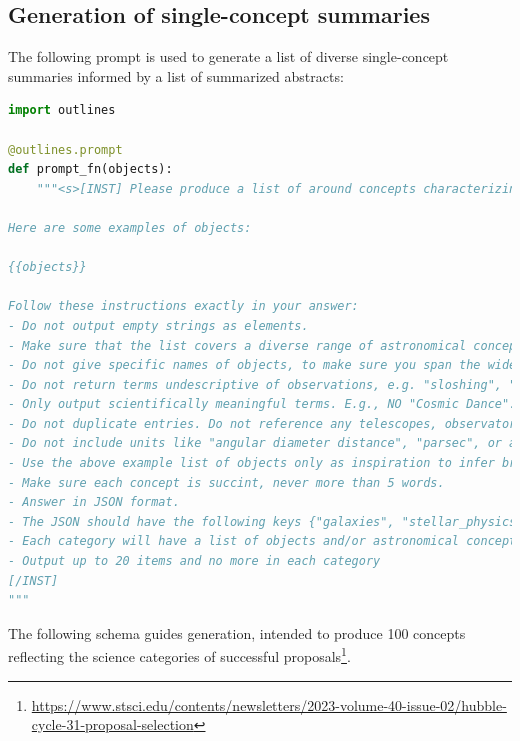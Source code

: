 \documentclass[10pt]{article} %
\begin{document}
\subsection{Generation of single-concept summaries}
\label{app:singleconcept}

The following prompt is used to generate a list of diverse single-concept summaries informed by a list of summarized abstracts:

\begin{lstlisting}[language=Python]
import outlines   

@outlines.prompt
def prompt_fn(objects):
    """<s>[INST] Please produce a list of around concepts characterizing prominent objects, phenomena, and science use cases of images observed by the Hubble Space Telescope.

Here are some examples of objects:

{{objects}}

Follow these instructions exactly in your answer:
- Do not output empty strings as elements.
- Make sure that the list covers a diverse range of astronomical concepts, with items as different from each other as possible. 
- Do not give specific names of objects, to make sure you span the widest possible range of concepts (e.g., "dwarf galaxy" is allowed, but NOT "Fornax", "Terzan 5", or  "NGC6440").
- Do not return terms undescriptive of observations, e.g. "sloshing", "adiabatic", "interactions". Returning concrete physics objects, concepts, or phenomena.
- Only output scientifically meaningful terms. E.g., NO "Cosmic Dance".
- Do not duplicate entries. Do not reference any telescopes, observatories, or surveys.
- Do not include units like "angular diameter distance", "parsec", or any other concepts that will not correlate with images of observations.
- Use the above example list of objects only as inspiration to infer broad classes of objects.
- Make sure each concept is succint, never more than 5 words.
- Answer in JSON format.
- The JSON should have the following keys {"galaxies", "stellar_physics", "exoplanets_planet_formation", "stellar_populations", "supermassive_black_holes", "solar_system", "integalactic_medium", "large_scale_structure"} reflecting rough observation categories.
- Each category will have a list of objects and/or astronomical concepts.
- Output up to 20 items and no more in each category
[/INST]
"""
\end{lstlisting}

The following schema guides generation, intended to produce 100 concepts reflecting the science categories of successful proposals\footnote{\url{https://www.stsci.edu/contents/newsletters/2023-volume-40-issue-02/hubble-cycle-31-proposal-selection}}.
%
\end{document}
